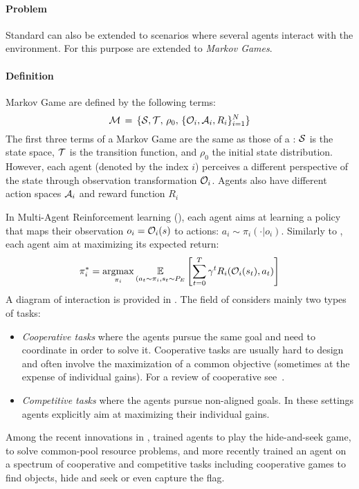 \paragraph{Problem}

Standard \rl can also be extended to scenarios where several agents interact with the environment. For this purpose \mdps are extended to \textit{Markov Games}.
\begin{tcolorbox}
\small
\paragraph{Definition}
\gls{Markov Game} are defined by the following terms:
\begin{equation}
	\mathcal{M}\,=\,\{\mathcal{S},\mathcal{T},\,\rho_0,\,\{\mathcal{O}_i,\mathcal{A}_i,R_i\}_{i=1}^N\}
	\label{eq:standard_mdp}	
\end{equation}
The first three terms of a Markov Game are the same as those of a \mdp: $\mathcal{S}$ is the state space, $\mathcal{T}$ is the transition function, and $\rho_0$ the initial state distribution. However, each agent (denoted by the index $i$) perceives a different perspective of the state through observation transformation $\mathcal{O}_i$. Agents also have different action spaces $\mathcal{A}_i$ and reward function $R_i$
\end{tcolorbox}

In Multi-Agent Reinforcement learning (\marl), each agent aims at learning a policy that maps their observation $o_i=\mathcal{O}_i(s)$ to actions: $a_i \sim \pi_i(\cdot|o_i)$. Similarly to \rl, each agent aim at maximizing its expected return:
\begin{equation}
	\pi_i^* = \operatorname*{argmax}_{\pi_i} \underset{(a_t\sim\pi_i, s_t \sim P_E}{\mathbb{E}}\left[\sum_{t=0}^T\gamma^tR_i(\mathcal{O}_i(s_t),a_t)\right]
\end{equation}
A diagram of interaction is provided in . The field of \marl considers mainly two types of tasks:
\begin{itemize}[noitemsep]
\item \textit{Cooperative tasks} where the agents pursue the same goal and need to coordinate in order to solve it. Cooperative tasks are usually hard to design and often involve the maximization of a common objective (sometimes at the expense of individual gains). For a review of cooperative \marl see~\citet{OroojlooyJadid2019cooperative}.
\item \textit{Competitive tasks} where the agents pursue non-aligned goals. In these settings agents explicitly aim at maximizing their individual gains. 
\end{itemize}
Among the recent innovations in \marl, \citet{Baker2020Emergent} trained agents to play the hide-and-seek game, \citet{perolat2017commonpool} to solve common-pool resource problems, and more recently \citet{team2021open} trained an agent on a spectrum of cooperative and competitive tasks including cooperative games to find objects, hide and seek or even capture the flag.

